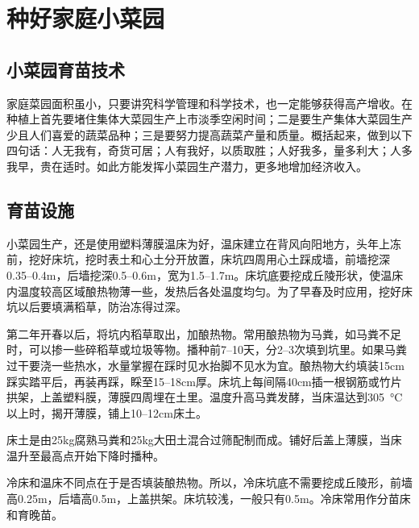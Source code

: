 \documentclass{ctexbook}
\begin{document}
\section{种好家庭小菜园}
\subsection{小菜园育苗技术}
家庭菜园面积虽小，只要讲究科学管理和科学技术，也一定能够获得高产增收。在种植上首先要堵住集体大菜园生产上市淡季空闲时间；二是要生产集体大菜园生产少且人们喜爱的蔬菜品种；三是要努力提高蔬菜产量和质量。概括起来，做到以下四句话：人无我有，奇货可居；人有我好，以质取胜；人好我多，量多利大；人多我早，贵在适时。如此方能发挥小菜园生产潜力，更多地增加经济收入。
\subsection{育苗设施}
小菜园生产，还是使用塑料薄膜温床为好，温床建立在背风向阳地方，头年上冻前，挖好床坑，挖时表土和心土分开放置，床坑四周用心土踩成墙，前墙挖深0.35--0.4m，后墙挖深0.5--0.6m，宽为1.5--1.7m。床坑底要挖成丘陵形状，使温床内温度较高区域酿热物薄一些，发热后各处温度均匀。为了早春及时应用，挖好床坑以后要填满稻草，防治冻得过深。

第二年开春以后，将坑内稻草取出，加酿热物。常用酿热物为马粪，如马粪不足时，可以掺一些碎稻草或垃圾等物。播种前7--10天，分2--3次填到坑里。如果马粪过干要浇一些热水，水量掌握在踩时见水抬脚不见水为宜。酿热物大约填装15cm踩实踏平后，再装再踩，睬至15--18cm厚。床坑上每间隔40cm插一根钢筋或竹片拱架，上盖塑料膜，薄膜四周埋在土里。温度升高马粪发酵，当床温达到30\SI{5}{\degreeCelsius}以上时，揭开薄膜，铺上10--12cm床土。

床土是由25kg腐熟马粪和25kg大田土混合过筛配制而成。铺好后盖上薄膜，当床温升至最高点开始下降时播种。

冷床和温床不同点在于是否填装酿热物。所以，冷床坑底不需要挖成丘陵形，前墙高0.25m，后墙高0.5m，上盖拱架。床坑较浅，一般只有0.5m。冷床常用作分苗床和育晚苗。
\end{document}
